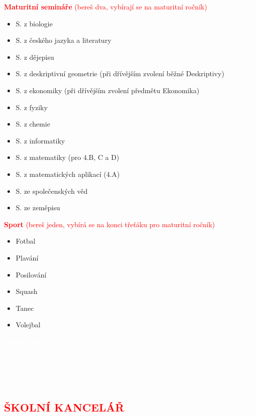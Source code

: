 \documentclass{article}
\newcommand{\podnadpis}[1]{
  \subsection*{\textcolor{red}{#1}}
}
\begin{document}
\begin{multicols}{2}
  \noindent \textcolor{red}{\textbf{Maturitní semináře} (bereš dva, vybírají se na maturitní ročník)}
  \begin{itemize}
    \item S. z biologie
    \item S. z českého jazyka a literatury
    \item S. z dějepisu
    \item S. z deskriptivní geometrie (při
    dřívějším zvolení běžné Deskriptivy)
    \item S. z ekonomiky (při dřívějším zvolení předmětu Ekonomika)
    \item S. z fyziky
    \item S. z chemie
    \item S. z informatiky
    \item S. z matematiky (pro 4.B, C a D)
    \item S. z matematických aplikací (4.A)
    \item S. ze společenských věd
    \item S. ze zeměpisu
  \end{itemize}

  \noindent \textcolor{red}{\textbf{Sport} (bereš jeden, vybírá se na konci třeťáku pro maturitní ročník)}
  \begin{itemize}
    \item Fotbal
    \item Plavání
    \item Posilování
    \item Squash
    \item Tanec
    \item Volejbal
  \end{itemize}

  \begin{tcolorbox}[colback=red,boxrule=0pt, sharp corners]
    \textcolor{white}{\footnotesize \textbf{Poznámka.}
     Některé předměty jsou označeny pro třídy X.A apod. Osnovy matematické a všeobecné třídy se trochu liší, a proto jim musí být
      uzpůsoben i repertoár volitelných předmětů.
      Výčet nemusí být kompletní:
      neustále se snažíme vymýšlet nové smysluplné
      předměty -- hlavně do čtvrťáku. A některé ze
      seznamu se vůbec nemusejí otevřít.}

      \hfill
\end{tcolorbox}
\end{multicols}

\newpage

\podnadpis{ŠKOLNÍ KANCELÁŘ}
\end{document}
